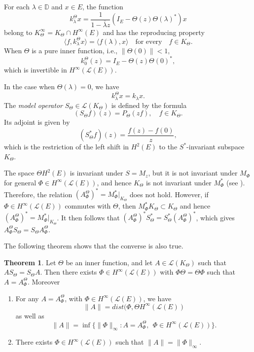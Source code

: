 \documentclass{amsart}
\theoremstyle{definition}
\newtheorem{thm}{Theorem}[section]
\newcommand{\oL }{\mathcal{L}(E) }
\begin{document}
For each $\lambda\in \mathbb{D}$ and $x\in E$, the function
$$k_{\lambda}^{\Theta}x=\frac{1}{1-\bar \lambda z}(I_{E}-\Theta(z)\Theta(\lambda)^*)x$$
belong to $K^{\infty}_{\Theta}=K_{\Theta}\cap H^{\infty}(E)$ and has the
 reproducing property
$$\langle f, k_{\lambda}^{\Theta}x\rangle=\langle f(\lambda), x\rangle \quad \text{for every}\quad f\in K_\Theta.$$
When $\Theta$ is a pure inner function, i.e., $\|\Theta(0)\|< 1$, 
$$k_{0}^{\Theta}(z)= I_{E}-\Theta(z)\Theta(0)^*,$$ which is invertible in $H^{\infty}(\oL)$. 


In the case when $\Theta(\lambda)=0$, we have
$$k_{\lambda}^{\Theta}x=k_{\lambda}x.$$
The \emph{model operator} $S_{\Theta}\in\mathcal{L}(K_{\Theta})$ is defined  by the formula
\begin{equation*}\label{eq:Model Operator}
(S_{\Theta}f)(z)=P_{\Theta} (zf), \quad f\in K_{\Theta}.
 \end{equation*}
Its adjoint is given by
\[
(S_{\Theta}^{*}f)(z)=\frac{f(z)-f(0)}{z},
\]
which is the restriction of the left shift in $H^{2}(E)$ to the $S^{*}$-invariant subspace $K_{\Theta}$.

The space $\Theta H^2(E)$ is invariant under $S=M_z$, but it is not invariant under $M_\Phi$ for general $\Phi\in H^{\infty}(\oL)$, and hence $K_\Theta$ is not invariant under $M^*_\Phi$ (see \cite[Example 4.1]{RT}). Therefore, the relation $(A^{\Theta}_\Phi)^*=M^*_\Phi|_{K_\Theta}$ does not hold. However, if $\Phi\in H^{\infty}(\oL)$ commutes with $\Theta$, then $M^*_\Phi K_\Theta\subset K_\Theta$ and hence $(A^{\Theta}_\Phi)^{*}=M^*_\Phi|_{K_\Theta}$. It then follows that $(A^{\Theta}_\Phi)^{*} S^*_\Theta=S^*_\Theta (A^{\Theta}_\Phi)^*$, which gives $A^{\Theta}_\Phi S_\Theta=S_{\Theta} A^{\Theta}_\Phi$.

\medskip

The following theorem shows that the converse is also true.


\begin{thm}\cite[Chapter VI]{NF}\label{clt}
    Let $\Theta$ be an inner function, and let $A\in \mathcal{L}(K_{\Theta})$ such that $AS_{\Theta}=S_{\Theta}A$. Then there exists $\Phi\in H^\infty(\mathcal{L}(E))$ with $\Phi\Theta=\Theta\Phi$ such that $A=A_{\Phi}^{\Theta}$. Moreover %
    \begin{enumerate}
        \item For any $A=A_{\Phi}^{\Theta}$, with $\Phi\in H^{\infty}(\oL)$, we have
        $$\|A\|=dist(\Phi, \Theta H^\infty(\oL)$$ as well as %
        $$\|A\|=\inf{\{\|\Phi\|_{\infty}: A=A_{\Phi}^{\Theta},~~\Phi\in H^{\infty}(\mathcal{L}(E))}\}.$$
        
        \item There exists $\Phi\in H^\infty(\oL)$ such that $\|A\|=\|\Phi\|_{\infty}.$
    \end{enumerate}
\end{thm}
\medskip
\end{document}
